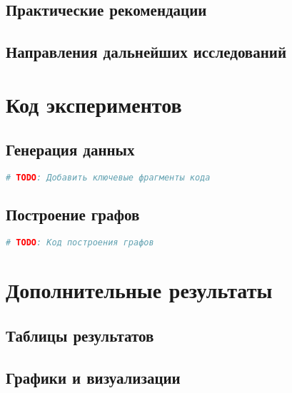\documentclass[a4paper,12pt]{report}
\begin{document}
\section*{Практические рекомендации}

\section*{Направления дальнейших исследований}

\appendix

\chapter{Код экспериментов}

\section{Генерация данных}
\begin{lstlisting}[language=Python, caption=Пример генерации данных]
# TODO: Добавить ключевые фрагменты кода
\end{lstlisting}

\section{Построение графов}
\begin{lstlisting}[language=Python, caption=Построение KNN-графа]
# TODO: Код построения графов
\end{lstlisting}

\chapter{Дополнительные результаты}

\section{Таблицы результатов}

\section{Графики и визуализации}
\end{document}
